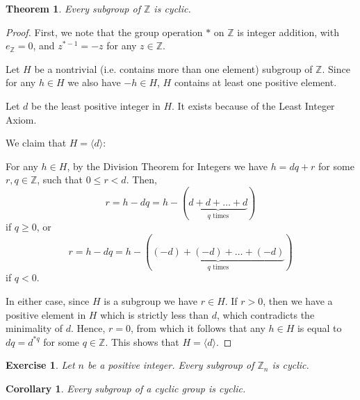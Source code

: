 \documentclass[a4paper,12pt]{report}
\newcounter{statement}
\numberwithin{statement}{chapter}
\newtheorem{thm}[statement]{Theorem}
\newtheorem{cor}[statement]{Corollary}
\newtheorem{ex}[statement]{\bf Exercise}
\numberwithin{equation}{chapter}
\numberwithin{section}{chapter}
\numberwithin{subsection}{section}
\begin{document}
\begin{thm}

Every subgroup of $\mathbb{Z}$ is cyclic.
\end{thm}
\begin{proof}

First, we note that the group operation $\ast$ on $\mathbb{Z}$
is integer addition, with $e_{\mathbb{Z}} = 0$,
and $z^{\ast -1} = -z$ for any $z \in \mathbb{Z}$.




Let $H$ be a nontrivial (i.e. contains more than one element)
subgroup of $\mathbb{Z}$.
Since for any $h \in H$ we also have $-h \in H$,
$H$ contains at least one positive element.




Let $d$ be the least positive integer in $H$.
It exists because of the Least Integer Axiom.



We claim that $H = \langle d \rangle$:




For any $h \in H$,
by the Division Theorem for Integers we have $h = dq + r$
for some $r, q \in \mathbb{Z}$, such that $0 \leq r < d$.  Then,
\[
r = h - dq = h - (\underbrace{d + d + \ldots + d}_{q \text{ times}})
\]
if $q \geq 0$, or
\[
r = h - dq = h - (\underbrace{(-d) + (-d) + \ldots + (-d)}_{q \text{ times}})
\]
if $q < 0$.




In either case, since $H$ is a subgroup we have $r \in H$.  If $r > 0$, then we have
a positive element in $H$ which is strictly less than $d$, which contradicts
the minimality of $d$.  Hence, $r = 0$, from which it follows that any $h \in H$
is equal to $dq = d^{\ast q}$ for some $q \in \mathbb{Z}$.
This shows that $H = \langle d \rangle$.
\end{proof}



\begin{ex}

Let $n$ be a positive integer.
Every subgroup of $\mathbb{Z}_n$ is cyclic.
\end{ex}



\begin{cor}

Every subgroup of a cyclic group is cyclic.
\end{cor}
\end{document}
